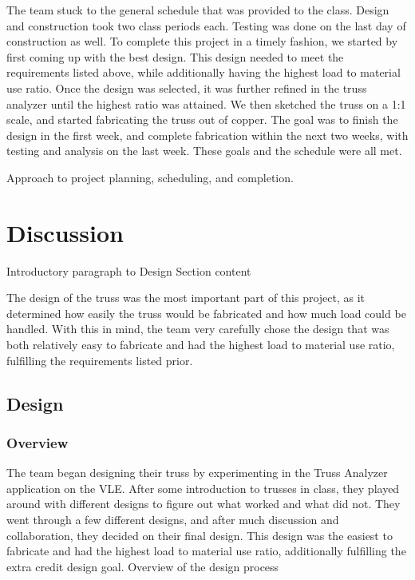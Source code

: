 \documentclass{article}
\let\Oldsection\section
\renewcommand{\section}{\FloatBarrier\Oldsection}
\let\Oldsubsection\subsection
\renewcommand{\subsection}{\FloatBarrier\Oldsubsection}
\let\Oldsubsubsection\subsubsection
\renewcommand{\subsubsection}{\FloatBarrier\Oldsubsubsection}
\begin{document}
The team stuck to the general schedule that was provided to the class. Design and construction took two class periods each. Testing was done on the last day of construction as well. To complete this project in a timely fashion, we started by first coming up with the best design. This design needed to meet the requirements listed above, while additionally having the highest load to material use ratio. Once the design was selected, it was further refined in the truss analyzer until the highest ratio was attained. We then sketched the truss on a 1:1 scale, and started fabricating the truss out of copper. The goal was to finish the design in the first week, and complete fabrication within the next two weeks, with testing and analysis on the last week. These goals and the schedule were all met.

Approach to project planning, scheduling, and completion.

\newpage

\section{Discussion}

Introductory paragraph to Design Section content

The design of the truss was the most important part of this project, as it determined how easily the truss would be fabricated and how much load could be handled. With this in mind, the team very carefully chose the design that was both relatively easy to fabricate and had the highest load to material use ratio, fulfilling the requirements listed prior.

\subsection{Design}

\subsubsection{Overview}

The team began designing their truss by experimenting in the Truss Analyzer application on the VLE. After some introduction to trusses in class, they played around with different designs to figure out what worked and what did not. They went through a few different designs, and after much discussion and collaboration, they decided on their final design. This design was the easiest to fabricate and had the highest load to material use ratio, additionally fulfilling the extra credit design goal.
Overview of the design process
\end{document}
